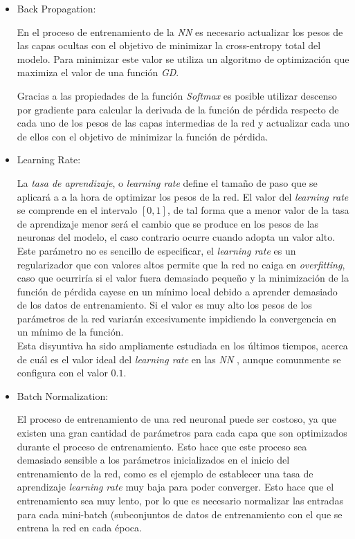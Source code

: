 \begin{itemize}
                \item Back Propagation:

                    En el proceso de entrenamiento de la \textit{NN} es necesario actualizar los pesos de las capas ocultas con el objetivo de minimizar la cross-entropy total del modelo. Para minimizar este valor se utiliza un algoritmo de optimización que maximiza el valor de una función \textit{GD}.

                    Gracias a las propiedades de la función \textit{Softmax} es posible utilizar descenso por gradiente para calcular la derivada de la función de pérdida respecto de cada uno de los pesos de las capas intermedias de la red y actualizar cada uno de ellos con el objetivo de minimizar la función de pérdida.

                \item Learning Rate:

                    La \textit{tasa de aprendizaje}, o \textit{learning rate} define el tamaño de paso que se aplicará a a la hora de optimizar los pesos de la red. El valor del \textit{learning rate} se comprende en el intervalo $[0,1]$, de tal forma que a menor valor de la tasa de aprendizaje menor será el cambio que se produce en los pesos de las neuronas del modelo, el caso contrario ocurre cuando adopta un valor alto.\\



                    Este parámetro no es sencillo de especificar, el \textit{learning rate} es un regularizador que con valores altos permite que la red no caiga en \textit{overfitting}, caso que ocurriría si el valor fuera demasiado pequeño y la minimización de la función de pérdida cayese en un mínimo local debido a aprender demasiado de los datos de entrenamiento. Si el valor es muy alto los pesos de los parámetros de la red variarán excesivamente impidiendo la convergencia en un mínimo de la función.\\

                    Esta disyuntiva ha sido ampliamente estudiada en los últimos tiempos, acerca de cuál es el valor ideal del \textit{learning rate} en las \textit{NN} \cite{LearningRate}, aunque comunmente se configura con el valor $0.1$.



                \item Batch Normalization:

                    El proceso de entrenamiento de una red neuronal puede ser costoso, ya que existen una gran cantidad de parámetros para cada capa que son optimizados durante el proceso de entrenamiento. Esto hace que este proceso sea demasiado sensible a los parámetros inicializados en el inicio del entrenamiento de la red, como es el ejemplo de establecer una tasa de aprendizaje \textit{learning rate} muy baja para poder converger. Esto hace que el entrenamiento sea muy lento, por lo que es necesario normalizar las entradas para cada mini-batch (subconjuntos de datos de entrenamiento con el que se entrena la red en cada época.\\



\end{itemize}
